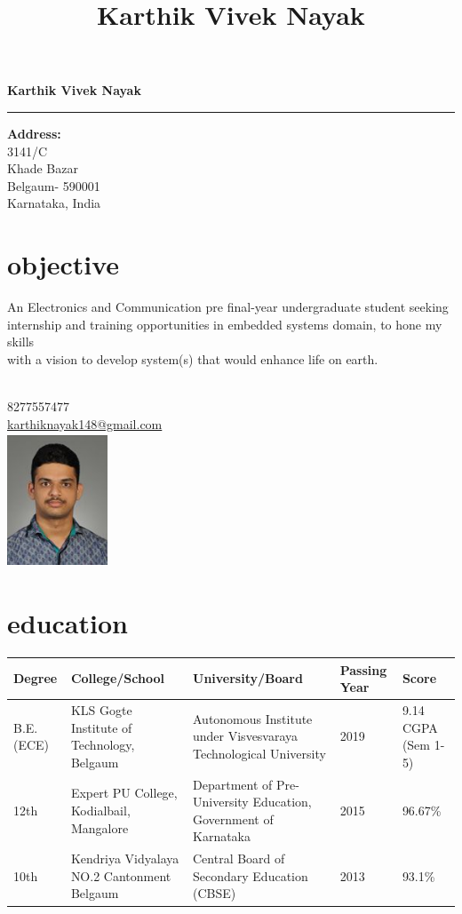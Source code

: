 \documentclass[10pt]{article}
\renewcommand{\maketitle}{
	\begin{center}
		\huge\bfseries
		Karthik Vivek Nayak
		\hrule
	\end{center}
\vspace{0.1cm}
}
\begin{document}
	\title{Karthik Vivek Nayak}
	\maketitle
	\begin{minipage}{0.8\linewidth}
		\textbf{Address:\\}
		3141/C\\
		Khade Bazar\\
		Belgaum- 590001 \\
		Karnataka, India\\ 
		\section*{objective}
		An Electronics and Communication pre final-year undergraduate student seeking \\ internship and training opportunities in embedded systems domain, to hone my skills\\ with a vision to develop system(s) that would enhance life on earth.
		\vspace{1cm}
	\end{minipage}
	\begin{minipage}{0.1\linewidth}
		\begin{flushright}
		\\
		8277557477\\
		\href{mailto:karthiknayak148@gmail.com}				   {karthiknayak148@gmail.com}\\
		\vspace{1cm}
		\includegraphics[width=3cm,height=4cm]{kartik.jpg}
		\end{flushright}
	\end{minipage}

	\section*{education}
	\begin{tabular}{|l|p{40mm}|p{50mm}|l|p{20mm}|}
		\hline
		Degree & College/School & University/Board & Passing Year & Score\\
		\hline
		B.E.(ECE)&KLS Gogte Institute of Technology, 	Belgaum&Autonomous Institute under Visvesvaraya Technological 	University&2019&9.14 CGPA (Sem 1-5)\\
		\hline
		12th &Expert PU College, Kodialbail, Mangalore&Department of Pre-University Education, Government of Karnataka&2015&96.67\%\\
		\hline
		10th &Kendriya Vidyalaya NO.2 Cantonment Belgaum&Central Board of Secondary Education (CBSE)&2013&93.1\%\\
		\hline
	\end{tabular}
	
\end{document}
